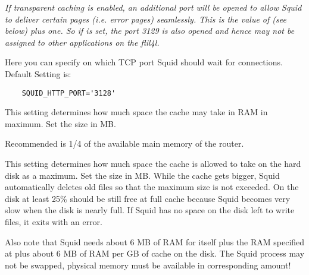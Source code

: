 \begin{description}
                \emph{If transparent caching is enabled, an additional port
                          will be opened to allow Squid to deliver certain pages
                          (i.e. error pages) seamlessly. This is the value
                          of  (see below) plus one. So if
                           is set, the port 3129 is
                          also opened and hence may not be assigned to other applications
                          on the flil4l.}


		Here you can specify on which TCP port Squid should wait for connections.
                Default Setting is:
\begin{verbatim}
	SQUID_HTTP_PORT='3128'
\end{verbatim}




		This setting determines how much space the cache
                may take in RAM in maximum. Set the size in MB.

                Recommended is 1/4 of the available main memory of the router.


		This setting determines how much space the cache is allowed
		to take on the hard disk as a maximum. Set the size in MB.
		While the cache gets bigger, Squid automatically deletes old
		files so that the maximum size is not exceeded.
		On the disk at least 25\% should be still free at full cache
		because Squid becomes very slow when the disk is nearly full.
		If Squid has no space on the disk left to write files, it exits
		with an error.

		Also note that Squid needs about 6 MB of RAM for itself plus
		the RAM specified at  plus about
		6 MB of RAM per GB of cache on the disk. The Squid process may
		not be swapped, physical memory must be available in corresponding amount!


\end{description}
